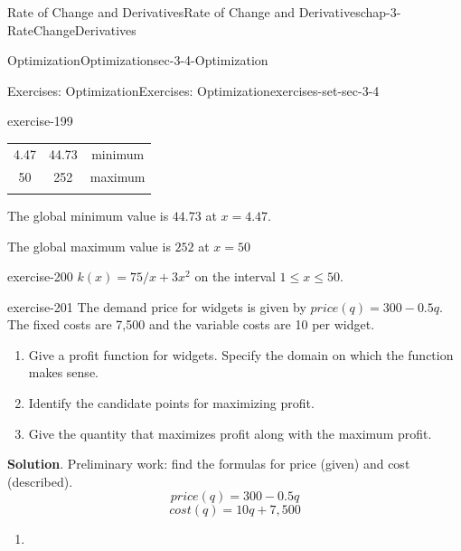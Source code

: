 \documentclass[oneside,10pt,]{book}
\numberwithin{equation}{section}
\newcommand{\hrulethin}  {\noalign{\hrule height 0.04em}}
\begin{document}
\begin{chapterptx}{Rate of Change and Derivatives}{}{Rate of Change and Derivatives}{}{}{chap-3-RateChangeDerivatives}
\begin{sectionptx}{Optimization}{}{Optimization}{}{}{sec-3-4-Optimization}
\begin{exercises-subsection-numberless}{Exercises: Optimization}{}{Exercises: Optimization}{}{}{exercises-set-sec-3-4}
\begin{exercisegroup}
\begin{divisionexerciseeg}{9}{}{}{exercise-199}
\begin{enumerate}[label=(\alph*)]
\begin{sidebyside}{1}{0}{0}{0}
\begin{sbspanel}{1}
{\begin{tabular}{ccc}
4.47&44.73&minimum\tabularnewline\hrulethin
50&252&maximum\tabularnewline\hrulethin
\end{tabular}
\par}
\end{sbspanel}%
\end{sidebyside}%
\par
\hypertarget{p-1294}{}%
The global minimum value is  \(44.73\) at \(x=4.47.\)%
\par
\hypertarget{p-1295}{}%
The global maximum value is  \(252\) at \(x=50\)%
\end{enumerate}
\end{divisionexerciseeg}%
\begin{divisionexerciseeg}{10}{}{}{exercise-200}%
\hypertarget{p-1296}{}%
\(k(x)=75/x+3 x^2\) on the interval \(1\le x\le 50\).%
\end{divisionexerciseeg}%
\end{exercisegroup}
\par\medskip\noindent
\begin{divisionexercise}{11}{}{}{exercise-201}%
\hypertarget{p-1297}{}%
The demand price for widgets is given by \(price(q)=300-0.5q\).  The fixed costs are \textdollar{}7,500 and the variable costs are \textdollar{}10 per widget.%
\leavevmode%
\begin{enumerate}[label=(\alph*)]
\item\hypertarget{li-412}{}\hypertarget{p-1298}{}%
Give a profit function for widgets.  Specify the domain on which the function makes sense.%
\item\hypertarget{li-413}{}\hypertarget{p-1299}{}%
Identify the candidate points for maximizing profit.%
\item\hypertarget{li-414}{}\hypertarget{p-1300}{}%
Give the quantity that maximizes profit along with the maximum profit.%
\end{enumerate}
\par\smallskip%
\noindent\textbf{Solution}.\hypertarget{solution-100}{}\quad%
\hypertarget{p-1301}{}%
Preliminary work: find the formulas for price (given) and cost (described).%
%
\begin{equation*}
price(q)=300-0.5q
\end{equation*}
%
\begin{equation*}
cost(q)=10 q+7,500
\end{equation*}
\leavevmode%
\begin{enumerate}[label=(\alph*)]
\item\hypertarget{li-415}{}%
\begin{equation*}

\end{equation*}
\end{enumerate}
\end{divisionexercise}
\end{exercises-subsection-numberless}
\end{sectionptx}
\end{chapterptx}
\end{document}
